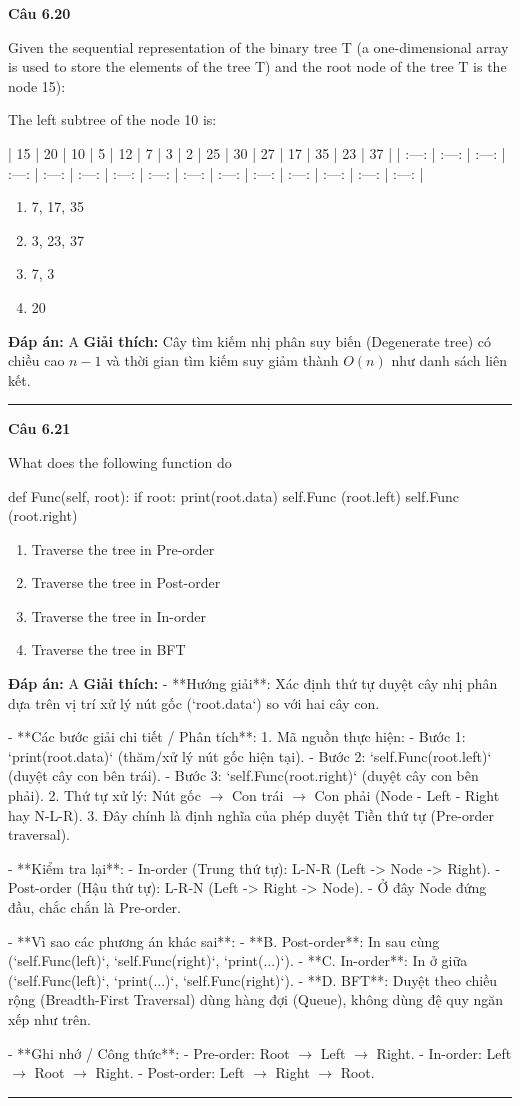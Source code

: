 \documentclass[11pt,a4paper]{article}
\newenvironment{question}[1]{%
  \par\vspace{1em}\noindent\textbf{\large Câu #1}\par\vspace{0.4em}
}{%
  \par\vspace{1em}\hrule\vspace{0.6em}
}
\newenvironment{choices}{%
  \begin{enumerate}[label=\textbf{\Alph*.},leftmargin=2.2em,itemsep=2pt,topsep=3pt]
}{%
  \end{enumerate}
}
\newcommand{\choice}{\item}
\newenvironment{codebox}{%
  \begin{tcolorbox}[colback=gray!8!white,colframe=gray!50!black,arc=1.5mm,boxrule=0.6pt,left=3mm,right=3mm,top=2.5mm,bottom=2.5mm]
  \ttfamily\small
}{%
  \end{tcolorbox}
}
\begin{document}
\begin{question}{6.20}
Given the sequential representation of the binary tree T (a one-dimensional array is used to store the elements of the tree T) and the root node of the tree T is the node 15):

The left subtree of the node 10 is:

| 15 | 20 | 10 | 5 | 12 | 7 | 3 | 2 | 25 | 30 | 27 | 17 | 35 | 23 | 37 |
| :---: | :---: | :---: | :---: | :---: | :---: | :---: | :---: | :---: | :---: | :---: | :---: | :---: | :---: | :---: |
\begin{choices}
\choice 7, 17, 35
\choice 3, 23, 37
\choice 7, 3
\choice 20
\end{choices}
\textbf{Đáp án:} A
\textbf{Giải thích:} Cây tìm kiếm nhị phân suy biến (Degenerate tree) có chiều cao \(n - 1\) và thời gian tìm kiếm suy giảm thành \(O(n)\) như danh sách liên kết.
\end{question}

\begin{question}{6.21}
What does the following function do
\begin{codebox}
def Func(self, root):
    if root:
        print(root.data)
        self.Func (root.left)
        self.Func (root.right)
\end{codebox}
\begin{choices}
\choice Traverse the tree in Pre-order
\choice Traverse the tree in Post-order
\choice Traverse the tree in In-order
\choice Traverse the tree in BFT
\end{choices}
\textbf{Đáp án:} A
\textbf{Giải thích:} - **Hướng giải**:
  Xác định thứ tự duyệt cây nhị phân dựa trên vị trí xử lý nút gốc (`root.data`) so với hai cây con.

- **Các bước giải chi tiết / Phân tích**:
  1. Mã nguồn thực hiện:
     - Bước 1: `print(root.data)` (thăm/xử lý nút gốc hiện tại).
     - Bước 2: `self.Func(root.left)` (duyệt cây con bên trái).
     - Bước 3: `self.Func(root.right)` (duyệt cây con bên phải).
  2. Thứ tự xử lý: Nút gốc \(\rightarrow\) Con trái \(\rightarrow\) Con phải (Node - Left - Right hay N-L-R).
  3. Đây chính là định nghĩa của phép duyệt Tiền thứ tự (Pre-order traversal).

- **Kiểm tra lại**:
  - In-order (Trung thứ tự): L-N-R (Left -> Node -> Right).
  - Post-order (Hậu thứ tự): L-R-N (Left -> Right -> Node).
  - Ở đây Node đứng đầu, chắc chắn là Pre-order.

- **Vì sao các phương án khác sai**:
  - **B. Post-order**: In sau cùng (`self.Func(left)`, `self.Func(right)`, `print(...)`).
  - **C. In-order**: In ở giữa (`self.Func(left)`, `print(...)`, `self.Func(right)`).
  - **D. BFT**: Duyệt theo chiều rộng (Breadth-First Traversal) dùng hàng đợi (Queue), không dùng đệ quy ngăn xếp như trên.

- **Ghi nhớ / Công thức**:
  - Pre-order: Root \(\rightarrow\) Left \(\rightarrow\) Right.
  - In-order: Left \(\rightarrow\) Root \(\rightarrow\) Right.
  - Post-order: Left \(\rightarrow\) Right \(\rightarrow\) Root.
\end{question}
\end{document}
